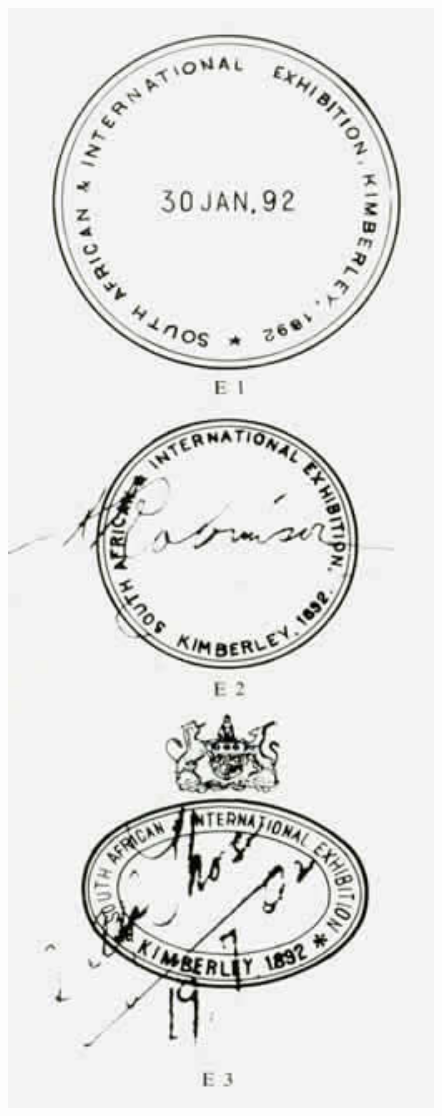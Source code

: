  
\begin{marginfigure}
\centering
\includegraphics[width=0.95\textwidth]{../cape-of-good-hope/Exhibition/Exhibition-Postmarks.jpg}
\end{marginfigure}

